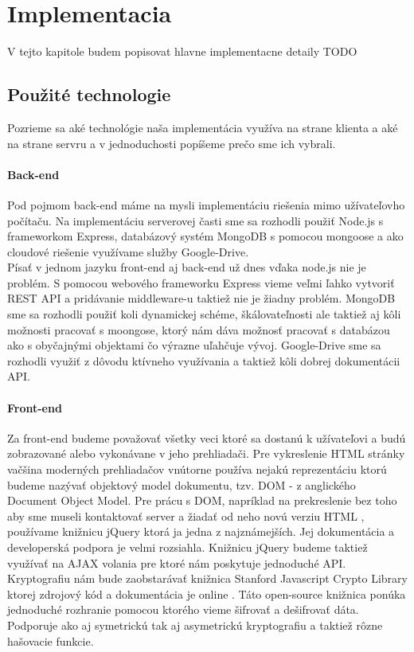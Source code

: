 \chapter{Implementacia}
	V tejto kapitole budem popisovat hlavne implementacne detaily
	TODO 
	
\section{Použité technologie}
	Pozrieme sa aké technológie naša implementácia využíva na strane klienta a aké na strane servru a v jednoduchosti popíšeme prečo sme ich vybrali.
	
	\subsubsection{Back-end}
	
		Pod pojmom back-end máme na mysli implementáciu riešenia mimo užívateľovho počítaču. Na implementáciu serverovej časti sme sa rozhodli použiť Node.js s frameworkom Express, databázový systém MongoDB s pomocou mongoose a ako cloudové riešenie využívame služby Google-Drive. 
		\\
		Písať v jednom jazyku front-end aj back-end už dnes vďaka node.js nie je problém. S pomocou webového frameworku Express vieme veľmi ľahko vytvoriť REST API a pridávanie middleware-u taktiež nie je žiadny problém. MongoDB sme sa rozhodli použiť koli dynamickej schéme, škálovateľnosti ale taktiež aj kôli možnosti pracovať s moongose, ktorý nám dáva možnosť pracovať s databázou ako s obyčajnými objektami čo výrazne uľahčuje vývoj. Google-Drive sme sa rozhodli využiť z dôvodu ktívneho využívania a taktiež kôli dobrej dokumentácii API.
		
	\subsubsection{Front-end}
	
		Za front-end budeme považovať všetky veci ktoré sa dostanú k užívateľovi a budú zobrazované alebo vykonávane v jeho prehliadači. Pre vykreslenie HTML stránky vačšina moderných prehliadačov vnútorne používa nejakú reprezentáciu ktorú budeme nazývať objektový model dokumentu, tzv. DOM - z anglického Document Object Model. Pre prácu s DOM, napríklad na prekreslenie bez toho aby sme museli kontaktovať server a žiadať od neho novú verziu HTML , používame knižnicu jQuery ktorá ja jedna z najznámejších. Jej dokumentácia a developerská podpora je velmi rozsiahla. Knižnicu jQuery budeme taktiež využívať na AJAX volania pre ktoré nám poskytuje jednoduché API. 
		\\
		Kryptografiu nám bude zaobstarávať knižnica Stanford Javascript Crypto Library ktorej zdrojový kód a dokumentácia je online \cite{SJCLgit}. Táto open-source knižnica ponúka jednoduché rozhranie pomocou ktorého vieme šifrovať a dešifrovať dáta. Podporuje ako aj symetrickú tak aj asymetrickú kryptografiu a taktiež rôzne hašovacie funkcie.

